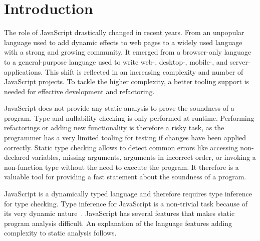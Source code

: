 \section{Introduction}\label{sec:introduction}
The role of JavaScript drastically changed in recent years. From an unpopular language used to add dynamic effects to web pages to a widely used language with a strong and growing community. It emerged from a browser-only language to a general-purpose language used to write web-, desktop-, mobile-, and server-applications. This shift is reflected in an increasing complexity and number of JavaScript projects. To tackle the higher complexity, a better tooling support is needed for effective development and refactoring.  

JavaScript does not provide any static analysis to prove the soundness of a program. Type and nullability checking is only performed at runtime. Performing refactorings or adding new functionality is therefore a risky task, as the programmer has a very limited tooling for testing if changes have been applied correctly. Static type checking allows to detect common errors like accessing non-declared variables, missing arguments, arguments in incorrect order, or invoking a non-function type without the need to execute the program. It therefore is a valuable tool for providing a fast statement about the soundness of a program.

JavaScript is a dynamically typed language and therefore requires type inference for type checking. Type inference for JavaScript is a non-trivial task because of its very dynamic nature~\cite{JensenMollerThiemann2009}. JavaScript has several features that makes static program analysis difficult. An explanation of the language features adding complexity to static analysis follows.

